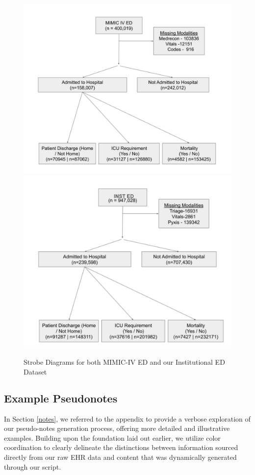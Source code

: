 \documentclass{article}
\theoremstyle{plain}
\theoremstyle{definition}
\theoremstyle{remark}
\begin{document}
{ \begin{figure}[b!]
   \centering 
   \includegraphics[width=4.5in]{plots/strobe1.png} 
   \includegraphics[width=4.5in]{plots/strobe2.png} 
   \caption{Strobe Diagrams for both MIMIC-IV ED and our Institutional ED Dataset}
   \label{strobe} 
 \end{figure} 
\newpage
\subsection{Example Pseudonotes}
\label{exnotes}

In Section \ref{notes}, we referred to the appendix to provide a verbose exploration of our pseudo-notes generation process, offering more detailed and illustrative examples. Building upon the foundation laid out earlier, we utilize color coordination to clearly delineate the  distinctions between information sourced directly from our raw EHR data and content that was dynamically generated through our script.

}
\end{document}
